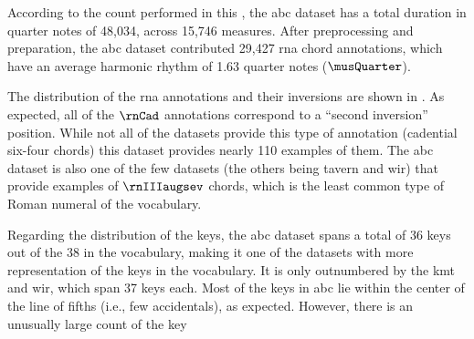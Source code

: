 
According to the count performed in this \thesisdiss{}, the
\gls{abc} dataset has a total duration in quarter notes of
48,034, across 15,746 measures. After preprocessing and
preparation, the \gls{abc} dataset contributed 29,427
\gls{rna} chord annotations, which have an average harmonic
rhythm of 1.63 quarter notes ($\musQuarter$).

The distribution of the \gls{rna} annotations and their
inversions are shown in . As
expected, all of the $\rnCad$ annotations correspond to a
``second inversion'' position. While not all of the datasets
provide this type of annotation (cadential six-four chords)
this dataset provides nearly 110 examples of them. The
\gls{abc} dataset is also one of the few datasets (the
others being \gls{tavern} and \gls{wir}) that provide
examples of $\rnIIIaugsev$ chords, which is the least common
type of Roman numeral of the vocabulary.


Regarding the distribution of the keys, the \gls{abc}
dataset spans a total of 36 keys out of the 38 in the
vocabulary, making it one of the datasets with more
representation of the keys in the vocabulary. It is only
outnumbered by the \gls{kmt} and \gls{wir}, which span 37
keys each. Most of the keys in \gls{abc} lie within the
center of the line of fifths (i.e., few accidentals), as
expected. However, there is an unusually large count of the key


